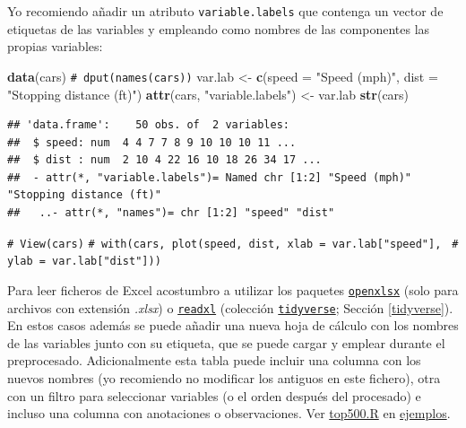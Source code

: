 \documentclass[
]{book}
\newenvironment{Shaded}{\begin{snugshade}}{\end{snugshade}}
\newcommand{\AttributeTok}[1]{\textcolor[rgb]{0.13,0.29,0.53}{#1}}
\newcommand{\CommentTok}[1]{\textcolor[rgb]{0.56,0.35,0.01}{\textit{#1}}}
\newcommand{\FunctionTok}[1]{\textcolor[rgb]{0.13,0.29,0.53}{\textbf{#1}}}
\newcommand{\NormalTok}[1]{#1}
\newcommand{\OtherTok}[1]{\textcolor[rgb]{0.56,0.35,0.01}{#1}}
\newcommand{\StringTok}[1]{\textcolor[rgb]{0.31,0.60,0.02}{#1}}
\theoremstyle{break}
\theoremstyle{nonumberplain}
\renewcommand{\CommentTok}[1]{\textcolor[rgb]{0.41,0.41,0.41}{\texttt{#1}}}
\begin{document}
Yo recomiendo añadir un atributo \texttt{variable.labels} que contenga un vector de etiquetas de las variables y empleando como nombres de las componentes las propias variables:

\begin{Shaded}
\begin{Highlighting}[]
\FunctionTok{data}\NormalTok{(cars)}
\CommentTok{\# dput(names(cars))}
\NormalTok{var.lab }\OtherTok{\textless{}{-}} \FunctionTok{c}\NormalTok{(}\AttributeTok{speed =} \StringTok{"Speed (mph)"}\NormalTok{, }\AttributeTok{dist =} \StringTok{"Stopping distance (ft)"}\NormalTok{)}
\FunctionTok{attr}\NormalTok{(cars, }\StringTok{"variable.labels"}\NormalTok{) }\OtherTok{\textless{}{-}}\NormalTok{ var.lab}
\FunctionTok{str}\NormalTok{(cars)}
\end{Highlighting}
\end{Shaded}

\begin{verbatim}
## 'data.frame':    50 obs. of  2 variables:
##  $ speed: num  4 4 7 7 8 9 10 10 10 11 ...
##  $ dist : num  2 10 4 22 16 10 18 26 34 17 ...
##  - attr(*, "variable.labels")= Named chr [1:2] "Speed (mph)" "Stopping distance (ft)"
##   ..- attr(*, "names")= chr [1:2] "speed" "dist"
\end{verbatim}

\begin{Shaded}
\begin{Highlighting}[]
\CommentTok{\# View(cars)}
\CommentTok{\# with(cars, plot(speed, dist, xlab = var.lab["speed"], }
\CommentTok{\#                 ylab = var.lab["dist"]))}
\end{Highlighting}
\end{Shaded}

Para leer ficheros de Excel acostumbro a utilizar los paquetes \href{https://cran.r-project.org/web/packages/openxlsx/index.html}{\texttt{openxlsx}} (solo para archivos con extensión \emph{.xlsx}) o \href{https://readxl.tidyverse.org}{\texttt{readxl}} (colección \href{https://www.tidyverse.org/}{\texttt{tidyverse}}; Sección \ref{tidyverse}).
En estos casos además se puede añadir una nueva hoja de cálculo con los nombres de las variables junto con su etiqueta, que se puede cargar y emplear durante el preprocesado.
Adicionalmente esta tabla puede incluir una columna con los nuevos nombres (yo recomiendo no modificar los antiguos en este fichero), otra con un filtro para seleccionar variables (o el orden después del procesado) e incluso una columna con anotaciones o observaciones.
Ver \href{ejemplos/top500/top500.R}{top500.R} en \href{https://github.com/rubenfcasal/book_notasr/tree/main/ejemplos}{ejemplos}.
\end{document}
